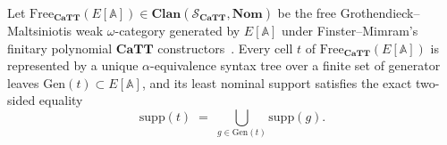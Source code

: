 \begin{lemma}\label{lem:polygraphic-support}%
%
%
Let $\mathrm{Free}_{\mathbf{CaTT}}(E[\mathbb{A}]) \in \mathbf{Clan}(\mathcal{S}_{\mathbf{CaTT}}, \mathbf{Nom})$ be the free Grothendieck--Maltsiniotis weak $\omega$-category generated by $E[\mathbb{A}]$ under Finster--Mimram's finitary polynomial $\mathbf{CaTT}$ constructors~\cite{FinsterMimram17,BCM26}. Every cell $t$ of $\mathrm{Free}_{\mathbf{CaTT}}(E[\mathbb{A}])$ is represented by a unique $\alpha$-equivalence syntax tree over a finite set of generator leaves $\mathrm{Gen}(t) \subset E[\mathbb{A}]$, and its least nominal support satisfies the exact two-sided equality
\[
  \mathrm{supp}(t) \;=\; \bigcup_{g \in \mathrm{Gen}(t)} \mathrm{supp}(g).
\]
\end{lemma}

